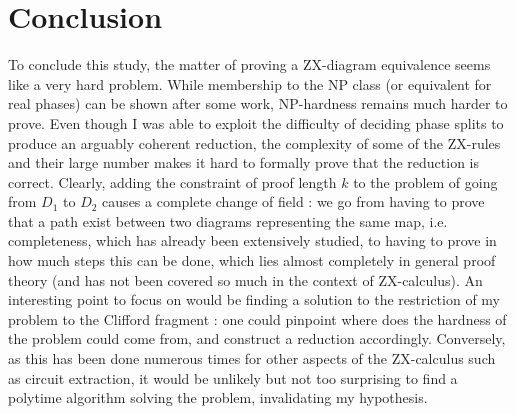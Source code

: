\documentclass[journal,onecolumn]{IEEEtran}
\begin{document}




\section{Conclusion}
To conclude this study, the matter of proving a ZX-diagram equivalence seems like a very hard problem. While membership to the \textsc{NP} class (or equivalent for real phases) can be shown after some work, \textsc{NP}-hardness remains much harder to prove. Even though I was able to exploit the difficulty of deciding phase splits to produce an arguably coherent reduction, the complexity of some of the ZX-rules and their large number makes it hard to formally prove that the reduction is correct. Clearly, adding the constraint of proof length $k$ to the problem of going from $D_1$ to $D_2$ causes a complete change of field : we go from having to prove that a path exist between two diagrams representing the same map, i.e. completeness, which has already been extensively studied, to having to prove in how much steps this can be done, which lies almost completely in general proof theory (and has not been covered so much in the context of ZX-calculus). An interesting point to focus on would be finding a solution to the restriction of my problem to the Clifford fragment : one could pinpoint where does the hardness of the problem could come from, and construct a reduction accordingly. Conversely, as this has been done numerous times for other aspects of the ZX-calculus such as circuit extraction, it would be unlikely but not too surprising to find a polytime algorithm solving the problem, invalidating my hypothesis.





\end{document}
